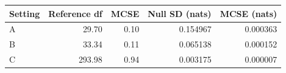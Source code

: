 \begin{tabular}{@{}lrrrr@{}}
\toprule
Setting & Reference df & MCSE & Null SD (nats) & MCSE (nats)\\
\midrule
A & 29.70 & 0.10 & 0.154967 & 0.000363\\
B & 33.34 & 0.11 & 0.065138 & 0.000152\\
C & 293.98 & 0.94 & 0.003175 & 0.000007\\
\bottomrule
\end{tabular}

